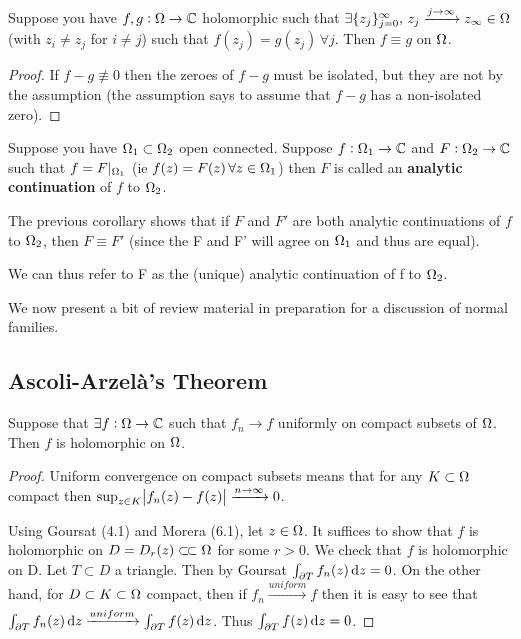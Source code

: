 
\begin{corollary}
Suppose you have $f,g: \Omega \to \mathbb{C}$ holomorphic such that $\exists \{ z_j \}_{j=0}^\infty, \, z_j \xrightarrow[]{j \to \infty} z_\infty \in \Omega$ (with $z_i \neq z_j$ for $i \neq j$) such that $f(z_j) = g(z_j) \, \forall j$. Then $f \equiv g$ on $\Omega$.
\end{corollary}

\begin{proof}
If $f-g \not\equiv 0$ then the zeroes of $f-g$ must be isolated, but they are not by the assumption (the assumption says to assume that $f-g$ has a non-isolated zero).
\end{proof}

\begin{definition}
Suppose you have $\Omega_1 \subset \Omega_2 $ open connected. Suppose $f: \Omega_1 \to \mathbb{C}$ and $F: \Omega_2 \to \mathbb{C}$ such that $f = F |_{\Omega_1}$ (ie $f(z) = F(z) \, \forall z \in \Omega_1$) then $F$ is called an \textbf{analytic continuation} of $f$ to $\Omega_2$.

\end{definition}


\begin{note}

The previous corollary shows that if $F$ and $F'$ are both analytic continuations of $f$ to $\Omega_2$, then $F \equiv F'$ (since the F and F' will agree on $\Omega_1$ and thus are equal).

We can thus refer to F as the (unique) analytic continuation of f to $\Omega_2$.
\end{note}

We now present a bit of review material in preparation for a discussion of normal families.

\subsection{Ascoli-Arzelà's Theorem}

\begin{proposition}
Suppose that $\exists f:\Omega \rightarrow \mathbb{C}$ such that $f_n \to f$ uniformly on compact subsets of $\Omega$. Then $f$ is holomorphic on $\Omega$.
\end{proposition}


\begin{proof}
Uniform convergence on compact subsets means that for any $K \subset \Omega$ compact then $\sup_{z\in K} \abs{f_n(z) - f(z)} \xrightarrow[]{n \to \infty} 0$. 

Using Goursat (4.1) and Morera (6.1), let $z\in \Omega$. It suffices to show that $f$ is holomorphic on $D=D_r(z) \ssubset \om $ for some $r>0$. We check that $f$ is holomorphic on D. Let $T \subset D$ a triangle. Then by Goursat $\int_{\partial T} f_n(z) \dif z =  0$. On the other hand, for $D \subset K \subset \Omega$ compact, then if $f_n \xrightarrow[]{uniform} f$ then it is easy to see that $\int_{\partial T} f_n(z) \dif z \xrightarrow[]{uniform} \int_{\partial T} f(z) \dif z$. Thus $\int_{\partial T} f(z) \dif z = 0$.
\end{proof}

